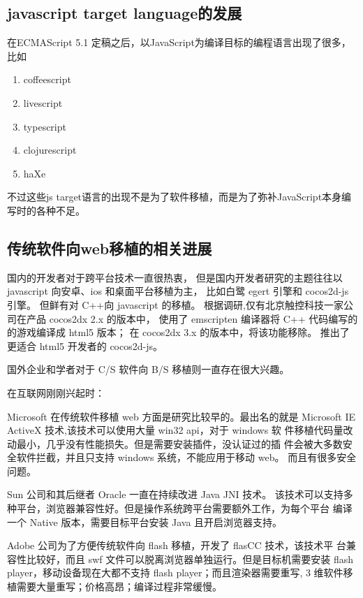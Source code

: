 \subsection{javascript target language的发展}

在ECMAScript 5.1 定稿之后，以JavaScript为编译目标的编程语言出现了很多，比如

\begin{enumerate}
    \item coffeescript 
    \item livescript
    \item typescript
    \item clojurescript
    \item haXe
\end{enumerate}

不过这些js target语言的出现不是为了软件移植，而是为了弥补JavaScript本身编写时的各种不足。

\subsection{传统软件向web移植的相关进展}

国内的开发者对于跨平台技术一直很热衷，
但是国内开发者研究的主题往往以 javascript 向安卓、ios 和桌面平台移植为主，
比如白鹭 egert 引擎和 cocos2d-js 引擎。
但鲜有对 C++向 javascript 的移植。
根据调研,仅有北京触控科技一家公司在产品 cocos2dx 2.x 的版本中，
使用了 emscripten 编译器将 C++ 代码编写的的游戏编译成 html5 版本；
在 cocos2dx 3.x 的版本中，将该功能移除。
推出了更适合 html5 开发者的 cocos2d-js。

国外企业和学者对于 C/S 软件向 B/S 移植则一直存在很大兴趣。

在互联网刚刚兴起时：

Microsoft 在传统软件移植 web 方面是研究比较早的。最出名的就是
Microsoft IE ActiveX 技术,该技术可以使用大量 win32 api，对于 windows 软
件移植代码量改动最小，几乎没有性能损失。但是需要安装插件，没认证过的插
件会被大多数安全软件拦截，并且只支持 windows 系统，不能应用于移动 web。
而且有很多安全问题。

Sun 公司和其后继者 Oracle 一直在持续改进 Java JNI  技术。
该技术可以支持多种平台，浏览器兼容性好。但是操作系统跨平台需要额外工作，为每个平台
编译一个 Native 版本，需要目标平台安装 Java 且开启浏览器支持。

Adobe 公司为了方便传统软件向 flash 移植，开发了 flasCC 技术，该技术平
台兼容性比较好，而且 swf 文件可以脱离浏览器单独运行。但是目标机需要安装
flash player，移动设备现在大都不支持 flash player；而且渲染器需要重写,
3 维软件移植需要大量重写；价格高昂；编译过程非常缓慢。

